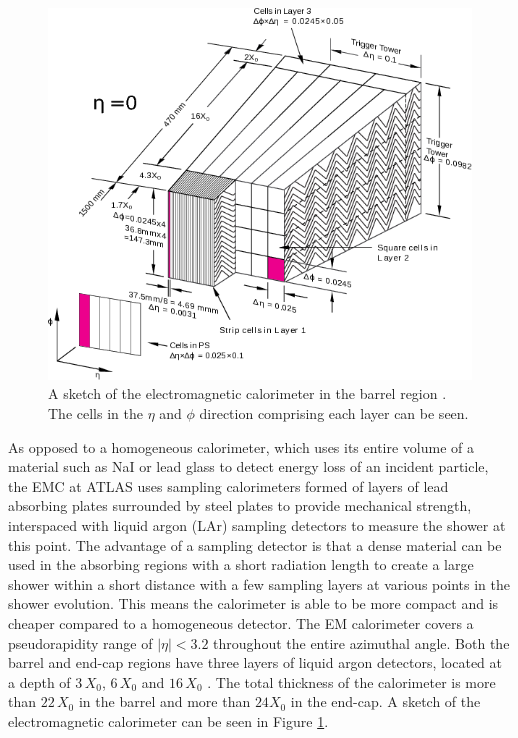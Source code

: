 \documentclass{article}
\begin{document}
\begin{figure}[h]
    \centering
    \includegraphics[scale=0.4]{images/ECAL.png}
    \caption{ A sketch of the electromagnetic calorimeter in the barrel region \cite{ATLASLAR}. The cells in the $\eta$ and $\phi$ direction comprising each layer can be seen. \label{fig:ECAL} }
\end{figure}

As opposed to a homogeneous calorimeter, which uses its entire volume of a material such as NaI or lead glass to detect energy loss of an incident particle, the EMC at ATLAS uses sampling calorimeters formed of layers of lead absorbing plates surrounded by steel plates to provide mechanical strength, interspaced with liquid argon (LAr) sampling detectors to measure the shower at this point. The advantage of a sampling detector is that a dense material can be used in the absorbing regions with a short radiation length to create a large shower within a short distance with a few sampling layers at various points in the shower evolution. This means the calorimeter is able to be more compact and is cheaper compared to a homogeneous detector. 
The EM calorimeter covers a pseudorapidity range of $|\eta|<3.2$ throughout the entire azimuthal angle. Both the barrel and end-cap regions have three layers of liquid argon detectors, located at a depth of $3\,X_0$, $6\,X_0$ and $16\,X_0$ \cite{ATLASCalorimetry}. The total thickness of the calorimeter is more than $22\,X_0$ in the barrel and more than $24X_0$ in the end-cap. A sketch of the electromagnetic calorimeter can be seen in Figure \ref{fig:ECAL}. 
\end{document}
